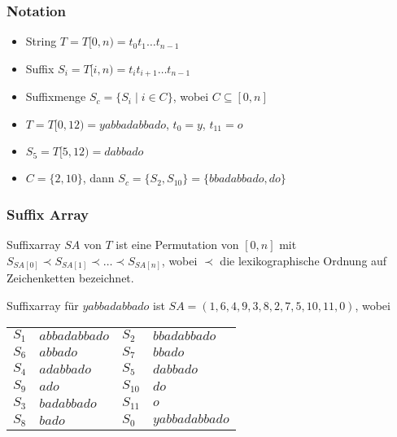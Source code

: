 \documentclass{beamer}
\begin{document}
\begin{frame}[fragile]
\frametitle{Notation}
\begin{itemize}
    \item String $T = T[0,n) = t_0t_1 \dots t_{n-1}$
    \item Suffix $S_i = T[i,n) = t_it_{i+1} \dots t_{n-1}$
    \item Suffixmenge $S_c = \{ S_i \mid i \in C\}$, wobei $C \subseteq [0,n]$
\end{itemize}
\begin{example}
\begin{itemize}
    \item $T = T[0,12) = yabbadabbado$, $t_0 = y$, $t_{11} = o$
    \item $S_5 = T[5,12) = dabbado$
    \item $C = \{2,10\}$, dann $S_c = \{ S_2, S_{10}\} = \{bbadabbado, do\}$
\end{itemize}
\end{example}
\end{frame}

\begin{frame}[fragile]
\frametitle{Suffix Array}
\begin{definition}
Suffixarray $SA$ von $T$ ist eine Permutation von $[0,n]$ mit $S_{SA[0]} \prec S_{SA[1]} \prec \dots \prec S_{SA[n]}$, wobei $\prec$ die lexikographische Ordnung auf Zeichenketten bezeichnet.
\end{definition}
\begin{example}
Suffixarray für $yabbadabbado$ ist $SA = (1, 6, 4, 9, 3, 8, 2, 7, 5, 10, 11, 0)$, wobei
\begin{table}
\begin{tabular}{l l|l l}
    \toprule
    $S_1$       & $a b b a d a b b a d o$ & $S_2$    & $b b a d a b b a d o$     \\
    $S_6$       & $a b b a d o$           & $S_7$    & $b b a d o$               \\
    $S_4$       & $a d a b b a d o$       & $S_5$    & $d a b b a d o$           \\
    $S_9$       & $a d o$                 & $S_{10}$ & $d o$                     \\
    $S_3$       & $b a d a b b a d o$     & $S_{11}$ & $o$                       \\
    $S_8$       & $b a d o$               & $S_0$    & $y a b b a d a b b a d o$ \\
    \bottomrule
\end{tabular}
\end{table}
\end{example}
\end{frame}
\end{document}
